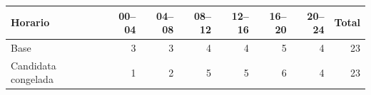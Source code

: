 \begin{tabular}{lrrrrrrr}
\toprule
Horario & 00--04 & 04--08 & 08--12 & 12--16 & 16--20 & 20--24 & Total \\
\midrule
Base & 3 & 3 & 4 & 4 & 5 & 4 & 23 \\
Candidata congelada & 1 & 2 & 5 & 5 & 6 & 4 & 23 \\
\bottomrule
\end{tabular}
